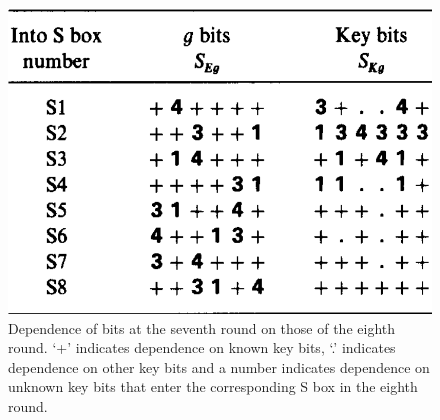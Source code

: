\documentclass[twoside]{article}
\begin{document}
\begin{figure}[!ht]
    \centering
    \includegraphics[width=0.5\linewidth]{images/des_8round_dep.png}
    \caption{Dependence of bits at the seventh round on those of the eighth round. `+' indicates dependence on known key bits, `.' indicates dependence on other key bits and a number indicates dependence on unknown key bits that enter the corresponding S box in the eighth round.}
    \label{fig:des-8rd-dep}
\end{figure}
\end{document}
